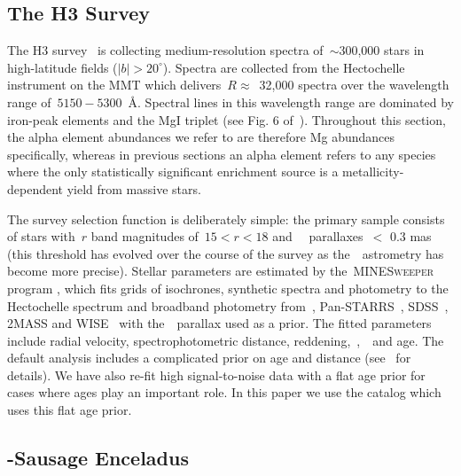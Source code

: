 \documentclass[ms.tex]{subfiles}
\begin{document}
\subsection{The H3 Survey}
\label{sec:h3:survey}

The H3 survey~\citep{Conroy2019} is collecting medium-resolution spectra
of~$\sim$300,000 stars in high-latitude fields ($\left|b\right| > 20^\circ$).
Spectra are collected from the Hectochelle instrument on the MMT
\citep{Szentgyorgyi2011} which delivers~$R \approx$~32,000 spectra over the
wavelength range of~$5150 - 5300$~\AA.
Spectral lines in this wavelength range are dominated by iron-peak elements and
the MgI triplet (see Fig. 6 of~\citealt{Conroy2019}).
Throughout this section, the alpha element abundances we refer to are therefore
Mg abundances specifically, whereas in previous sections an alpha element
refers to any species where the only statistically significant enrichment
source is a metallicity-dependent yield from massive stars.
\par
The survey selection function is deliberately simple: the primary sample
consists of stars with~$r$ band magnitudes of~$15 < r < 18$
and~\gaia~\citep{Gaia2016} parallaxes~$<$ 0.3 mas (this threshold has evolved
over the course of the survey as the~\gaia~astrometry has become more precise).
Stellar parameters are estimated by the~\textsc{MINESweeper} program
\citep{Cargile2020}, which fits grids of isochrones, synthetic spectra and
photometry to the Hectochelle spectrum and broadband photometry from~\gaia,
Pan-STARRS~\citep{Chambers2016}, SDSS~\citep{York2000}, 2MASS
\citep{Skrutskie2006} and WISE~\citep{Wright2010} with the~\gaia~parallax
used as a prior.
The fitted parameters include radial velocity, spectrophotometric distance,
reddening,~\feh,~\afe~and age.
The default analysis includes a complicated prior on age and distance
(see~\citealt{Cargile2020} for details).
We have also re-fit high signal-to-noise data with a flat age prior for cases
where ages play an important role.
In this paper we use the catalog which uses this flat age prior.


\subsection{\gaia-Sausage Enceladus}
\label{sec:h3:gse}


\end{document}
